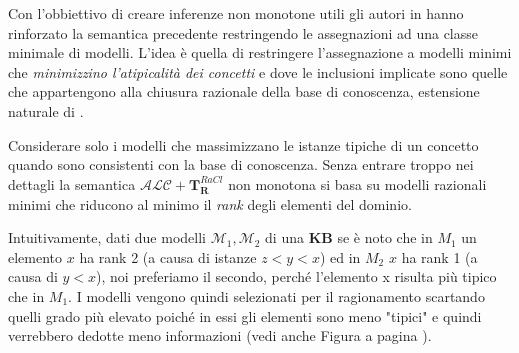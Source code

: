 Con l'obbiettivo di creare inferenze non monotone utili gli autori in \cite{FromPLtoDL} hanno rinforzato la semantica precedente restringendo le assegnazioni ad una classe minimale di modelli. 
L’idea è quella di restringere l’assegnazione a modelli minimi che \textit{minimizzino l'atipicalità dei concetti} e
dove le inclusioni implicate sono quelle che appartengono alla chiusura razionale della base di conoscenza, 
estensione naturale di \cite{Conditional_KB}.

Considerare solo i modelli che massimizzano le istanze tipiche di un concetto quando sono 
consistenti con la base di conoscenza.
Senza entrare troppo nei dettagli la semantica $\mathcal{ALC} + \mathbf{T}_{\mathbf{R}}^{\mathit{RaCl}}$
non monotona si basa su modelli razionali minimi che riducono al minimo il \textit{rank} degli elementi del dominio.

Intuitivamente, dati due modelli $ \mathcal{M_1,M_2} $ di una \textbf{KB} se è noto che 
in $ M_1 $ un elemento $ x $ ha rank 2 (a causa di istanze $ z < y < x $) ed
in $ M_2 $ $ x $ ha rank 1 (a causa di $ y < x $), noi preferiamo il secondo,
perché l’elemento x risulta più tipico che in $ M_1 $.
I modelli vengono quindi selezionati per il ragionamento scartando quelli grado più elevato poiché in essi gli elementi sono meno "tipici" e quindi verrebbero dedotte meno informazioni (vedi anche Figura a pagina \pageref{fig:valutaz}).

\clearpage

